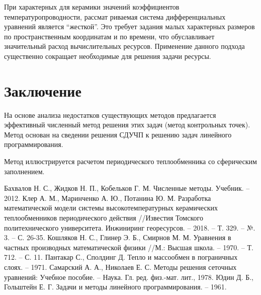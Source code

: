 \documentclass[a4paper,11pt,numreferences,mathsec,kaplist]{isuepsutf8}
\begin{document}
\begin{article}
При характерных для керамики значений коэффициентов
температуропроводности, рассмат риваемая система дифференциальных
уравнений является “жесткой”. Это требует задания малых характерных
размеров по пространственным координатам и по времени, что
обуславливает значительный расход вычислительных ресурсов. Применение
данного подхода существенно сокращает необходимые для решения задачи
ресурсы. 

\section{Заключение}

На основе анализа недостатков существующих методов предлагается
эффективный численный метод решения этих задач (метод контрольных
точек). Метод основан на сведении решения СДУЧП к решению задач
линейного программирования.

Метод иллюстрируется расчетом периодического теплообменника со
сферическим заполнением.

\begin{thebibliography}{999}
 Бахвалов Н. С., Жидков Н. П., Кобельков Г. М.
    Численные методы. Учебник. – 2012.
 Клер А. М., Маринченко А. Ю., Потанина Ю. М.
    Разработка математической модели системы высокотемпературных
    керамических теплообменников периодического действия
    //Известия Томского политехнического университета. Инжиниринг
    георесурсов. – 2018. – Т. 329. – №. 3. – С. 26-35.
 Кошляков Н. С., Глинер Э. Б., Смирнов М. М.
    Уравнения в частных производных математической физики //М.:
    Высшая школа. – 1970. – Т. 712. – С. 11.
 Пантакар С., Сполдинг Д. Тепло и массообмен в
    пограничных слоях. – 1971.
 Самарский А. А., Николаев Е. С. Методы решения
    сеточных уравнений: Учебное пособие. – Наука. Гл. ред. физ.-мат.
        лит., 1978.
 Юдин Д. Б., Гольштейн Е. Г. Задачи и методы линейного
    программирования. – 1961.


\end{thebibliography}
\end{article}
\end{document}
